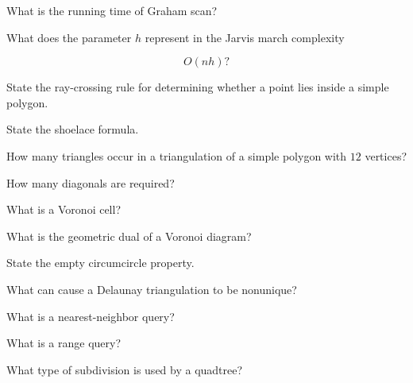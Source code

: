 \begin{exercise}[1]
What is the running time of Graham scan?
\end{exercise}

\begin{exercise}[1]
What does the parameter \(h\) represent in the Jarvis march complexity

\[
O(nh)?
\]
\end{exercise}

\begin{exercise}[1]
State the ray-crossing rule for determining whether a point lies inside a
simple polygon.
\end{exercise}

\begin{exercise}[1]
State the shoelace formula.
\end{exercise}

\begin{exercise}[1]
How many triangles occur in a triangulation of a simple polygon with
\(12\) vertices?
\end{exercise}

\begin{exercise}[1]
How many diagonals are required?
\end{exercise}

\begin{exercise}[1]
What is a Voronoi cell?
\end{exercise}

\begin{exercise}[1]
What is the geometric dual of a Voronoi diagram?
\end{exercise}

\begin{exercise}[1]
State the empty circumcircle property.
\end{exercise}

\begin{exercise}[1]
What can cause a Delaunay triangulation to be nonunique?
\end{exercise}

\begin{exercise}[1]
What is a nearest-neighbor query?
\end{exercise}

\begin{exercise}[1]
What is a range query?
\end{exercise}

\begin{exercise}[1]
What type of subdivision is used by a quadtree?
\end{exercise}

